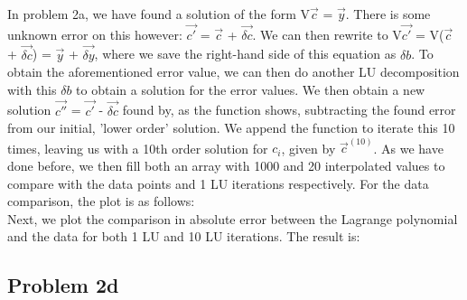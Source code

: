In problem 2a, we have found a solution of the form V$\vec{c}$ = $\vec{y}$. There is some unknown error on this however: $\vec{c'}$ = $\vec{c}$ + $\vec{\delta c}$. We can then rewrite to V$\vec{c'}$ = V($\vec{c}$ + $\vec{\delta c}$) = $\vec{y}$ + $\vec{\delta y}$, where we save the right-hand side of this equation as $\delta b$. To obtain the aforementioned error value, we can then do another LU decomposition with this $\delta b$ to obtain a solution for the error values. We then obtain a new solution $\vec{c''}$ = $\vec{c'}$ - $\vec{\delta c}$ found by, as the function shows, subtracting the found error from our initial, 'lower order' solution. We append the function to iterate this 10 times, leaving us with a 10th order solution for $c_i$, given by $\vec{c}^{(10)}$. As we have done before, we then fill both an array with 1000 and 20 interpolated values to compare with the data points and 1 LU iterations respectively. For the data comparison, the plot is as follows:\\

Next, we plot the comparison in absolute error between the Lagrange polynomial and the data for both 1 LU and 10 LU iterations. The result is:\\

\subsection{Problem 2d}

